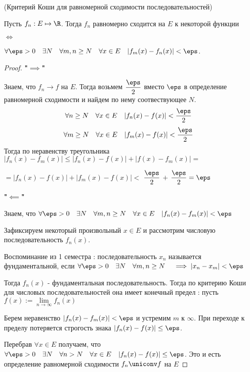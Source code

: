 
\begin{theorem} (Критерий Коши для равномерной сходимости последовательностей) \thmslashn
	
	\begin{center} {Пусть $f_n : E \mapsto \R$. Тогда $f_n$ равномерно сходится на $E$ к некоторой функции} \end{center}
	
	\begin{center} $\iff$ \end{center}
	
	\begin{center} $\forall{ \eps > 0}\quad {\exists N} \quad \forall{ m,n \ge N}\quad \forall {x \in E} \quad |f_m(x) - f_n(x)| < \eps$. \end{center}
	\begin{proof} \thmslashn
		
		\textbf{"$\implies$"}
		
		Знаем, что $f_n \to f$ на $E$. Тогда возьмем $\displaystyle \frac{\eps}{2}$ вместо $\eps$ в определение равномерной сходимости и найдем по нему соотвествующее $N$.
		\[\forall{ n \ge N} \quad \forall{ x \in E }\quad |f_n(x) - f(x)| < \frac{\eps}{2}\]
		\[\forall{ m \ge N} \quad \forall{ x \in E }\quad |f_m(x) - f(x)| < \frac{\eps}{2}\]
		Тогда по неравенству треугольника $|f_n(x) - f_m(x)| \le |f_n(x) - f(x)| + |f(x) - f_m(x)| =$ 
		
		$= |f_n(x) - f(x)| + |f_m(x) - f(x)| < $ $\displaystyle \frac{\eps}{2}$ $+$ $ \displaystyle \frac{\eps}{2} = \eps$
		
		\textbf{"$\impliedby$"}
		
		Знаем, что $\forall {\eps > 0} \quad {\exists N} \quad \forall {m,n \ge N} \quad \forall {x \in E} \quad |f_n(x) - f_m(x)| < \eps$
		
		Зафиксируем некоторый произвольный $x \in E$ и рассмотрим числовую последовательность $f_n(x)$. 
		\begin{remark}
			Воспоминание из 1 семестра : последовательность $x_n$ называется фундаментальной, если $\forall {\eps > 0} \quad {\exists N} \quad \forall{ m,n \ge N} \quad \implies |x_n - x_m| < \eps$
		\end{remark}
		
		Тогда $f_n(x)$ - фундаментальная последовательность. Тогда по критерию Коши для числовых последовательностей она имеет конечный предел : пусть $f(x) := \lim\limits_{n \to \infty} f_n(x)$
		
		Берем неравенство $|f_n(x) - f_m(x)| < \eps$ и устремим $m$ к $\infty$. При переходе к пределу потеряется строгость знака $|f_n(x) - f(x)| \le \eps$.
		
		Перебрав $\forall x \in E$ получаем, что $\forall {\eps > 0} \quad {\exists N} \quad \forall {n > N} \quad \forall {x \in E} \quad |f_n(x) - f(x)| \le \eps$. Это и есть определение равномерной сходимости $f_n \uniconv f$ на $E$
	\end{proof}
\end{theorem}